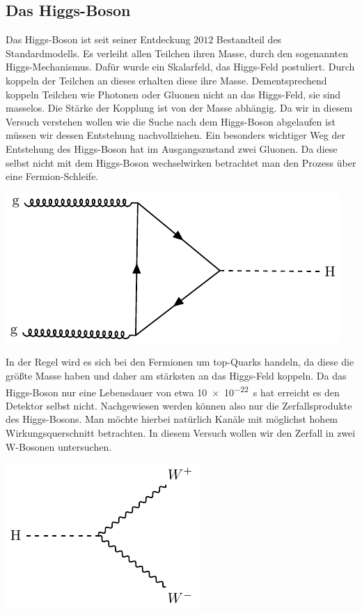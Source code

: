 \subsection{Das Higgs-Boson}
Das Higgs-Boson ist seit seiner Entdeckung $2012$ Bestandteil des Standardmodells.
Es verleiht allen Teilchen ihren Masse, durch den sogenannten Higgs-Mechanismus.
Dafür wurde ein Skalarfeld, das Higgs-Feld postuliert.
Durch koppeln der Teilchen an dieses erhalten diese ihre Masse.
Dementsprechend koppeln Teilchen wie Photonen oder Gluonen nicht an das Higgs-Feld, sie sind masselos.
Die Stärke der Kopplung ist von der Masse abhängig.
Da wir in diesem Versuch verstehen wollen wie die Suche nach dem Higgs-Boson abgelaufen ist müssen wir dessen Entstehung nachvollziehen.
Ein besonders wichtiger Weg der Entstehung des Higgs-Boson hat im Ausgangszustand zwei Gluonen.
Da diese selbst nicht mit dem Higgs-Boson wechselwirken betrachtet man den Prozess über eine Fermion-Schleife.
\begin{center}
  \includegraphics{../Pictures/generate_feynman_higgs/higgs-feynman.pdf}
  \label{Higgs-aus-gg}
\end{center}
In der Regel wird es sich bei den Fermionen um top-Quarks handeln, da diese die größte Masse haben und daher am stärksten an das Higgs-Feld koppeln.
Da das Higgs-Boson nur eine Lebensdauer von etwa \SI{10e-22}{\second} hat erreicht es den Detektor selbst nicht.
Nachgewiesen werden können also nur die Zerfallsprodukte des Higgs-Bosons.
Man möchte hierbei natürlich Kanäle mit möglichst hohem Wirkungsquerschnitt betrachten.
In diesem Versuch wollen wir den Zerfall in zwei W-Bosonen untersuchen.
\begin{center}
  \includegraphics{../Pictures/generate_feynman_HWW/HWW-feynman.pdf}
  \label{HWW}
\end{center}
